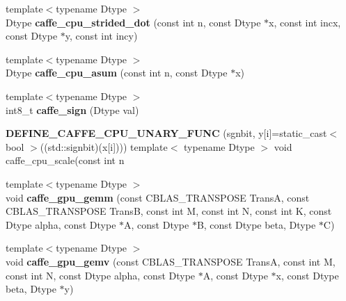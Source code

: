 \begin{DoxyCompactItemize}
\item 
{\footnotesize template$<$typename Dtype $>$ }\\Dtype {\bfseries caffe\+\_\+cpu\+\_\+strided\+\_\+dot} (const int n, const Dtype $\ast$x, const int incx, const Dtype $\ast$y, const int incy)\hypertarget{namespacecaffe_af401f4f153cf2baa894135d472d87208}{}\label{namespacecaffe_af401f4f153cf2baa894135d472d87208}

\item 
{\footnotesize template$<$typename Dtype $>$ }\\Dtype {\bfseries caffe\+\_\+cpu\+\_\+asum} (const int n, const Dtype $\ast$x)\hypertarget{namespacecaffe_a39ef2dac3af2dd5db02b5d3fce2dcfa8}{}\label{namespacecaffe_a39ef2dac3af2dd5db02b5d3fce2dcfa8}

\item 
{\footnotesize template$<$typename Dtype $>$ }\\int8\+\_\+t {\bfseries caffe\+\_\+sign} (Dtype val)\hypertarget{namespacecaffe_a74763da6c7165f1c0a86a796f966679a}{}\label{namespacecaffe_a74763da6c7165f1c0a86a796f966679a}

\item 
{\bfseries D\+E\+F\+I\+N\+E\+\_\+\+C\+A\+F\+F\+E\+\_\+\+C\+P\+U\+\_\+\+U\+N\+A\+R\+Y\+\_\+\+F\+U\+NC} (sgnbit, y\mbox{[}i\mbox{]}=static\+\_\+cast$<$ bool $>$((std\+::signbit)(x\mbox{[}i\mbox{]}))) template$<$ typename Dtype $>$ void caffe\+\_\+cpu\+\_\+scale(const int n\hypertarget{namespacecaffe_a02c98b32b264ec87bc2c02c94319bbc4}{}\label{namespacecaffe_a02c98b32b264ec87bc2c02c94319bbc4}

\item 
{\footnotesize template$<$typename Dtype $>$ }\\void {\bfseries caffe\+\_\+gpu\+\_\+gemm} (const C\+B\+L\+A\+S\+\_\+\+T\+R\+A\+N\+S\+P\+O\+SE TransA, const C\+B\+L\+A\+S\+\_\+\+T\+R\+A\+N\+S\+P\+O\+SE TransB, const int M, const int N, const int K, const Dtype alpha, const Dtype $\ast$A, const Dtype $\ast$B, const Dtype beta, Dtype $\ast$C)\hypertarget{namespacecaffe_acd0bf508fdb0581c6fb6dfa559e1677b}{}\label{namespacecaffe_acd0bf508fdb0581c6fb6dfa559e1677b}

\item 
{\footnotesize template$<$typename Dtype $>$ }\\void {\bfseries caffe\+\_\+gpu\+\_\+gemv} (const C\+B\+L\+A\+S\+\_\+\+T\+R\+A\+N\+S\+P\+O\+SE TransA, const int M, const int N, const Dtype alpha, const Dtype $\ast$A, const Dtype $\ast$x, const Dtype beta, Dtype $\ast$y)\hypertarget{namespacecaffe_a2b0a245011fcb3812f8b203987158798}{}\label{namespacecaffe_a2b0a245011fcb3812f8b203987158798}


\end{DoxyCompactItemize}

